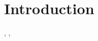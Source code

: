 \chapter{Introduction}
\citep{Kuijken_2008}, \cite{Refregier_2003_1}, \cite{Refregier_2003_2} \cite{Kuijken_2015}